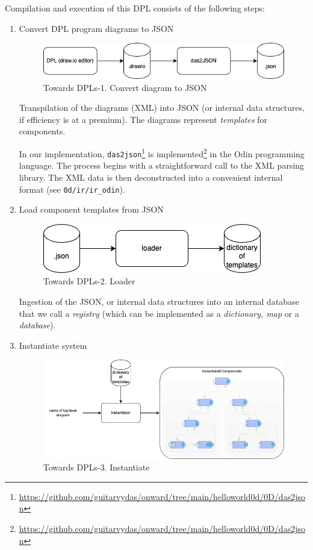 \documentclass{acmart}
\begin{document}
Compilation and execution of this DPL consists of the following steps:

\begin{enumerate}
  \item Convert DPL program diagrams to JSON

  \begin{figure}[h]
    \centering
    \includegraphics[width=0.8\linewidth]{./media/image2.png}
    \caption{Towards DPLs-1. Convert diagram to JSON}
    \label{fig:convert_to_json}
  \end{figure}

  Transpilation of the diagrams (XML) into JSON (or internal data structures, if efficiency is at a premium). The diagrams represent \emph{templates} for components.
  
  In our implementation, \texttt{das2json}\footnote{\url{https://github.com/guitarvydas/onward/tree/main/helloworld0d/0D/das2json}} is implemented\footnote{\url{https://github.com/guitarvydas/onward/tree/main/helloworld0d/0D/das2json}} in the Odin programming language. The process begins with a straightforward call to the XML parsing library. The XML data is then deconstructed into a convenient internal format (see \texttt{0d/ir/ir\_odin}).

  \item Load component templates from JSON

  \begin{figure}[h]
    \centering
    \includegraphics[width=0.6\linewidth]{./media/image3.png}
    \caption{Towards DPLs-2. Loader}
    \label{fig:load_templates}
  \end{figure}

  Ingestion of the JSON, or internal data structures into an internal database that we call a \emph{registry} (which can be implemented as a \emph{dictionary, map} or a \emph{database}).

  \item Instantiate system

  \begin{figure}[h]
    \centering
    \includegraphics[width=0.8\linewidth]{./media/image4.png}
    \caption{Towards DPLs-3. Instantiate}
    \label{fig:instantiate_system}
  \end{figure}


\end{enumerate}
\end{document}
